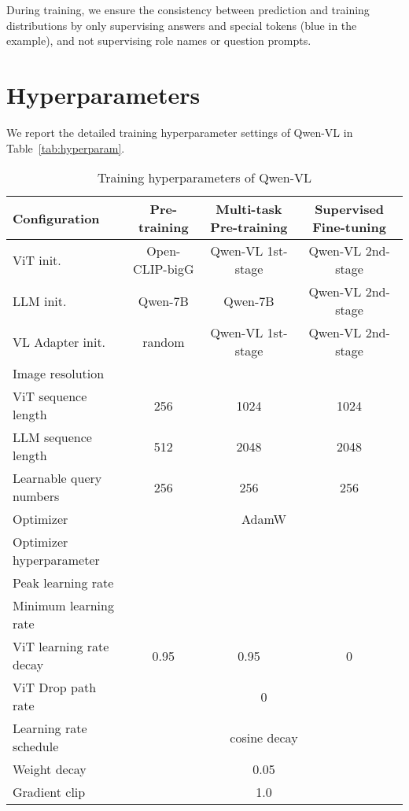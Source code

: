 \documentclass{article}
\newcommand{\tablestyle}[2]{\setlength{\tabcolsep}{#1}\renewcommand{\arraystretch}{#2}\centering\footnotesize}
\begin{document}
During training, we ensure the consistency between prediction and training distributions by only supervising answers and special tokens (blue in the example), and not supervising role names or question prompts.  

\section{Hyperparameters}
\label{app:hyperparam}
We report the detailed training hyperparameter settings of Qwen-VL in Table~\ref{tab:hyperparam}.

\begin{table}[htbp]
    \centering
    \tablestyle{7pt}{1.3}
    \caption{Training hyperparameters of Qwen-VL}
    \begin{tabular}{l ccc}
         \toprule
         Configuration            & Pre-training & Multi-task Pre-training & Supervised Fine-tuning \\
         \midrule
         ViT init.                & Open-CLIP-bigG & Qwen-VL 1st-stage & Qwen-VL 2nd-stage \\
         LLM init.                & Qwen-7B & Qwen-7B & Qwen-VL 2nd-stage \\
         VL Adapter init.         & random & Qwen-VL 1st-stage & Qwen-VL 2nd-stage \\
         Image resolution         &  &  &  \\
         ViT sequence length      & 256 & 1024 & 1024 \\
         LLM sequence length      & 512 & 2048 & 2048\\
         Learnable query numbers  & 256 & 256 & 256\\
         Optimizer                & \multicolumn{3}{c}{AdamW} \\
         Optimizer hyperparameter & \multicolumn{3}{c}{} \\
         Peak learning rate       &  &  &  \\
         Minimum learning rate    &  &  &  \\
         ViT learning rate decay  & 0.95 & 0.95 & 0 \\
         ViT Drop path rate       & \multicolumn{3}{c}{0} \\
         Learning rate schedule   & \multicolumn{3}{c}{cosine decay} \\
         Weight decay             & \multicolumn{3}{c}{0.05} \\
         Gradient clip            & \multicolumn{3}{c}{1.0} \\

\end{tabular}
\end{table}
\end{document}
